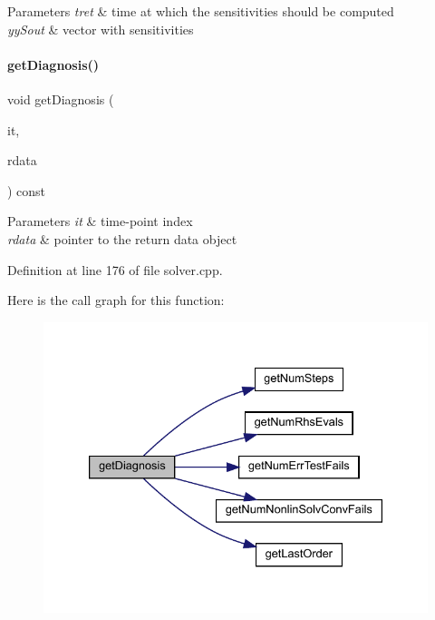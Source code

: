 \begin{DoxyParams}{Parameters}
{\em tret} & time at which the sensitivities should be computed \\
\hline
{\em yy\+Sout} & vector with sensitivities \\
\hline
\end{DoxyParams}
\mbox{\label{classamici_1_1_solver_a07318808fed3463ea8de7f25e3698343}} 
\paragraph{\texorpdfstring{getDiagnosis()}{getDiagnosis()}}
{\footnotesize\ttfamily void get\+Diagnosis (\begin{DoxyParamCaption}\item[{const int}]{it,  }\item[{\mbox{\hyperlink{classamici_1_1_return_data}{Return\+Data}} $\ast$}]{rdata }\end{DoxyParamCaption}) const}


\begin{DoxyParams}{Parameters}
{\em it} & time-\/point index \\
\hline
{\em rdata} & pointer to the return data object \\
\hline
\end{DoxyParams}


Definition at line 176 of file solver.\+cpp.

Here is the call graph for this function\+:
\nopagebreak
\begin{figure}[H]
\begin{center}
\leavevmode
\includegraphics[width=333pt]{classamici_1_1_solver_a07318808fed3463ea8de7f25e3698343_cgraph}
\end{center}
\end{figure}
\mbox{\label{classamici_1_1_solver_aa7aec3090326db73739483e141e65cda}} 
